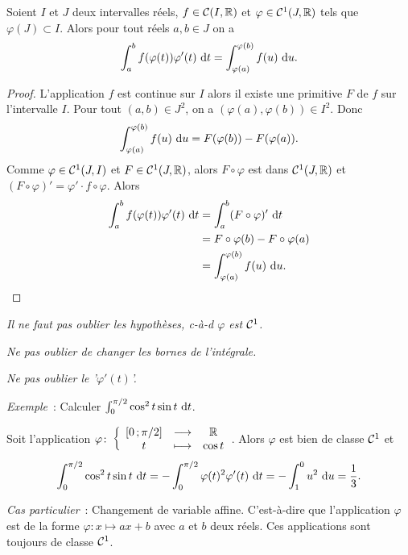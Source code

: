 \begin{theo}
  Soient \(I\) et \(J\) deux intervalles réels, \(f \in \mathcal{C}(I,\mathbb{R})\) et
  \(\varphi \in \mathcal{C}^{1}(J,\mathbb{R})\) tels que \(\varphi(J) \subset I\). Alors pour
  tout réels \(a, b \in J\) on a
  \begin{equation}
    \int_a^b f(\varphi(t)) \varphi'(t)\,\mathop{}\mathopen{}\mathrm{d} t = \int_{\varphi(a)}^{\varphi(b)}
    f(u)\,\mathop{}\mathopen{}\mathrm{d} u.
  \end{equation}
\end{theo}
\begin{proof}
  L'application \(f\) est continue sur \(I\) alors il existe une primitive \(F\)
  de \(f\) sur l'intervalle \(I\). Pour tout \((a,b) \in J^2\), on a
  \((\varphi(a), \varphi(b)) \in I^2\). Donc
  \begin{equation}
    \int_{\varphi(a)}^{\varphi(b)}f(u)\,\mathop{}\mathopen{}\mathrm{d} u = F(\varphi(b)) - F(\varphi(a)).
  \end{equation}
  Comme \(\varphi \in \mathcal{C}^{1}(J,I)\) et \(F \in \mathcal{C}^{1}(J,\mathbb{R})\), alors \(F
  \circ \varphi\) est dans  \(\mathcal{C}^{1}(J,\mathbb{R})\) et \((F\circ \varphi)' = \varphi'
  \cdot f \circ \varphi\). Alors
  \begin{align*}
    \int_a^b f(\varphi(t)) \varphi'(t)\,\mathop{}\mathopen{}\mathrm{d} t &= \int_a^b (F\circ
    \varphi)'\,\mathop{}\mathopen{}\mathrm{d} t\\
    & = F\circ \varphi(b) - F\circ \varphi(a) \\
    & = \int_{\varphi(a)}^{\varphi(b)}f(u)\,\mathop{}\mathopen{}\mathrm{d} u.
  \end{align*}
\end{proof}

\danger \emph{Il ne faut pas oublier les hypothèses, c-à-d \(\varphi\) est
\(\mathcal{C}^{1}\).}

\danger \emph{Ne pas oublier de changer les bornes de l'intégrale.}

\danger \emph{Ne pas oublier le '\(\varphi'(t)\)'.}

\emph{Exemple}~: Calculer \(\int_0^{\pi/2} \cos^2 t \sin t\,\mathop{}\mathopen{}\mathrm{d} t\).

Soit l'application \(\varphi\colon\left\{\begin{array}{ccc}\left[ 0 \, ; {} \pi/2 \right] & \longrightarrow &\mathbb{R}\\t & \longmapsto & \cos
t\end{array}\right.\). Alors \(\varphi\) est bien de classe \(\mathcal{C}^{1}\) et
\begin{equation}
  \int_0^{\pi/2} \cos^2 t \sin t\,\mathop{}\mathopen{}\mathrm{d} t = -\int_0^{\pi/2}
  \varphi(t)^2\varphi'(t)\,\mathop{}\mathopen{}\mathrm{d} t = -\int_1^0 u^2\,\mathop{}\mathopen{}\mathrm{d} u =\frac{1}{3}.
\end{equation}


\emph{Cas particulier}~: Changement de variable affine. C'est-à-dire que
l'application \(\varphi\) est de la forme \(\varphi : x \longmapsto ax+b\) avec
\(a\) et \(b\) deux réels. Ces applications sont toujours de classe
\(\mathcal{C}^{1}\).

